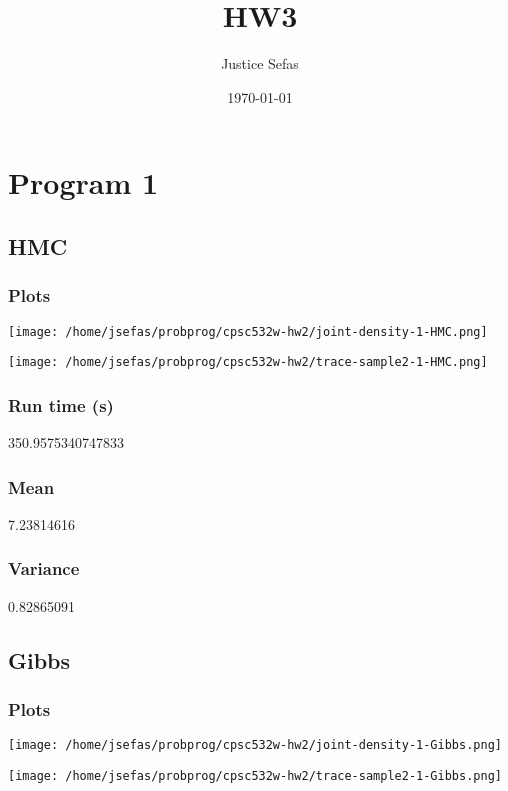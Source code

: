 \documentclass[11pt]{article}
\author{Justice Sefas}
\date{\today}
\title{HW3}
\begin{document}
\maketitle


\section*{Program 1}
\label{sec:orgdaf29dc}
\subsection*{HMC}
\label{sec:orgc36d491}
\subsubsection*{Plots}
\label{sec:orgcc46288}
\begin{center}
\texttt{[image: /home/jsefas/probprog/cpsc532w-hw2/joint-density-1-HMC.png]}
\end{center}
\begin{center}
\texttt{[image: /home/jsefas/probprog/cpsc532w-hw2/trace-sample2-1-HMC.png]}
\end{center}
\subsubsection*{Run time (s)}
\label{sec:orgc67fdc3}
350.9575340747833
\subsubsection*{Mean}
\label{sec:orgc55b09b}
7.23814616
\subsubsection*{Variance}
\label{sec:orge74f620}
0.82865091

\subsection*{Gibbs}
\label{sec:org93d989b}
\subsubsection*{Plots}
\label{sec:org15e5dc8}
\begin{center}
\texttt{[image: /home/jsefas/probprog/cpsc532w-hw2/joint-density-1-Gibbs.png]}
\end{center}
\begin{center}
\texttt{[image: /home/jsefas/probprog/cpsc532w-hw2/trace-sample2-1-Gibbs.png]}
\end{center}
\end{document}
